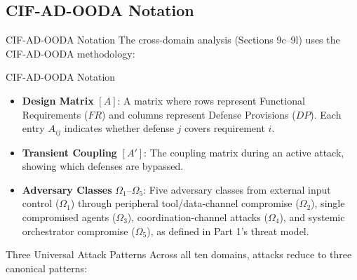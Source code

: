 \documentclass[
  ignorenonframetext,
]{beamer}
\providecommand{\tightlist}{%
  \setlength{\itemsep}{0pt}\setlength{\parskip}{0pt}}
\begin{document}
\subsection{CIF-AD-OODA Notation}\label{cif-ad-ooda-notation}

\begin{frame}[allowframebreaks]{CIF-AD-OODA Notation}
The cross-domain analysis (Sections 9c--9l) uses the CIF-AD-OODA
methodology:

\end{frame}

\begin{frame}[allowframebreaks]{CIF-AD-OODA Notation}
\begin{itemize}
\tightlist
\item
  \textbf{Design Matrix} \([A]\): A matrix where rows represent
  Functional Requirements (\(FR\)) and columns represent Defense
  Provisions (\(DP\)). Each entry \(A_{ij}\) indicates whether defense
  \(j\) covers requirement \(i\).
\item
  \textbf{Transient Coupling} \([A']\): The coupling matrix during an
  active attack, showing which defenses are bypassed.
\item
  \textbf{Adversary Classes} \(\Omega_1\)--\(\Omega_5\): Five adversary
  classes from external input control (\(\Omega_1\)) through peripheral
  tool/data-channel compromise (\(\Omega_2\)), single compromised agents
  (\(\Omega_3\)), coordination-channel attacks (\(\Omega_4\)), and
  systemic orchestrator compromise (\(\Omega_5\)), as defined in Part
  1's threat model.
\end{itemize}
\end{frame}

\begin{frame}[allowframebreaks]{Three Universal Attack Patterns}
\protect{}\label{three-universal-attack-patterns}
Across all ten domains, attacks reduce to three canonical patterns:

\end{frame}
\end{document}
